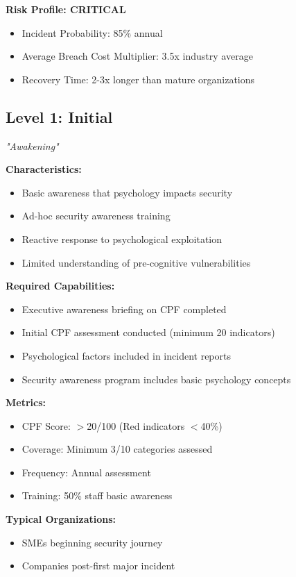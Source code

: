 \documentclass[11pt,a4paper]{article}
\begin{document}
\textbf{Risk Profile: CRITICAL}
\begin{itemize}
\item Incident Probability: 85\% annual
\item Average Breach Cost Multiplier: 3.5x industry average
\item Recovery Time: 2-3x longer than mature organizations
\end{itemize}

\subsection{Level 1: Initial}
\textit{"Awakening"}

\textbf{Characteristics:}
\begin{itemize}
\item Basic awareness that psychology impacts security
\item Ad-hoc security awareness training
\item Reactive response to psychological exploitation
\item Limited understanding of pre-cognitive vulnerabilities
\end{itemize}

\textbf{Required Capabilities:}
\begin{itemize}
\item Executive awareness briefing on CPF completed
\item Initial CPF assessment conducted (minimum 20 indicators)
\item Psychological factors included in incident reports
\item Security awareness program includes basic psychology concepts
\end{itemize}

\textbf{Metrics:}
\begin{itemize}
\item CPF Score: $>$20/100 (Red indicators $<$40\%)
\item Coverage: Minimum 3/10 categories assessed
\item Frequency: Annual assessment
\item Training: 50\% staff basic awareness
\end{itemize}

\textbf{Typical Organizations:}
\begin{itemize}
\item SMEs beginning security journey
\item Companies post-first major incident
\end{itemize}
\end{document}
